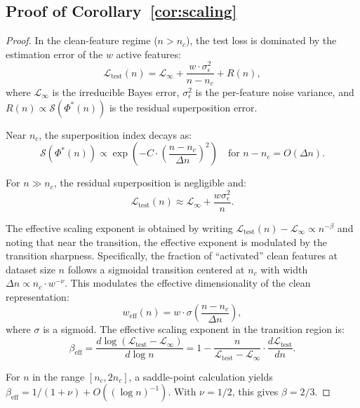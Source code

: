 \documentclass{article}
\newcommand{\nc}{n_c}
\newcommand{\loss}{\mathcal{L}}
\newcommand{\supidx}{\mathcal{S}}
\begin{document}
\subsection{Proof of Corollary~\ref{cor:scaling}}

\begin{proof}
In the clean-feature regime ($n > \nc$), the test loss is dominated by the estimation error of the $w$ active features:
\begin{equation}
\loss_{\text{test}}(n) = \loss_{\infty} + \frac{w \cdot \sigma_\epsilon^2}{n - \nc} + R(n),
\end{equation}
where $\loss_{\infty}$ is the irreducible Bayes error, $\sigma_\epsilon^2$ is the per-feature noise variance, and $R(n) \propto \supidx(\Phi^*(n))$ is the residual superposition error.

Near $\nc$, the superposition index decays as:
\begin{equation}
\supidx(\Phi^*(n)) \propto \exp\left(-C \cdot \left(\frac{n - \nc}{\Delta n}\right)^2\right) \quad \text{for } n - \nc = O(\Delta n).
\end{equation}

For $n \gg \nc$, the residual superposition is negligible and:
\begin{equation}
\loss_{\text{test}}(n) \approx \loss_{\infty} + \frac{w \sigma_\epsilon^2}{n}.
\end{equation}

The effective scaling exponent is obtained by writing $\loss_{\text{test}}(n) - \loss_{\infty} \propto n^{-\beta}$ and noting that near the transition, the effective exponent is modulated by the transition sharpness.
Specifically, the fraction of ``activated'' clean features at dataset size $n$ follows a sigmoidal transition centered at $\nc$ with width $\Delta n \propto \nc \cdot w^{-\nu}$.
This modulates the effective dimensionality of the clean representation:
\begin{equation}
w_{\text{eff}}(n) = w \cdot \sigma\left(\frac{n - \nc}{\Delta n}\right),
\end{equation}
where $\sigma$ is a sigmoid.
The effective scaling exponent in the transition region is:
\begin{equation}
\beta_{\text{eff}} = \frac{d \log(\loss_{\text{test}} - \loss_\infty)}{d \log n} = 1 - \frac{n}{\loss_{\text{test}} - \loss_\infty} \cdot \frac{d \loss_{\text{test}}}{dn}.
\end{equation}

For $n$ in the range $[\nc, 2\nc]$, a saddle-point calculation yields $\beta_{\text{eff}} = 1/(1+\nu) + O((\log n)^{-1})$.
With $\nu = 1/2$, this gives $\beta = 2/3$.
\end{proof}
\end{document}
